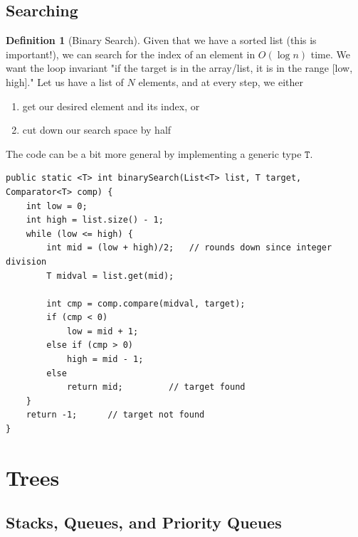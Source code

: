 \documentclass{article}
\theoremstyle{definition}
\theoremstyle{remark}
\theoremstyle{definition}
\newtheorem{definition}{Definition}[section]
\begin{document}
\subsection{Searching}

\begin{definition}[Binary Search]
Given that we have a sorted list (this is important!), we can search for the index of an element in $O(\log{n})$ time. We want the loop invariant "if the target is in the array/list, it is in the range [low, high]." Let us have a list of $N$ elements, and at every step, we either 
\begin{enumerate}
    \item get our desired element and its index, or 
    \item cut down our search space by half
\end{enumerate}
The code can be a bit more general by implementing a generic type $\texttt{T}$. 
\begin{verbatim}
public static <T> int binarySearch(List<T> list, T target, Comparator<T> comp) {
    int low = 0; 
    int high = list.size() - 1; 
    while (low <= high) {
        int mid = (low + high)/2;   // rounds down since integer division
        T midval = list.get(mid); 
        
        int cmp = comp.compare(midval, target); 
        if (cmp < 0) 
            low = mid + 1; 
        else if (cmp > 0) 
            high = mid - 1; 
        else 
            return mid;         // target found 
    }
    return -1;      // target not found 
}
\end{verbatim}
\end{definition}

\section{Trees}

\subsection{Stacks, Queues, and Priority Queues}
\end{document}
